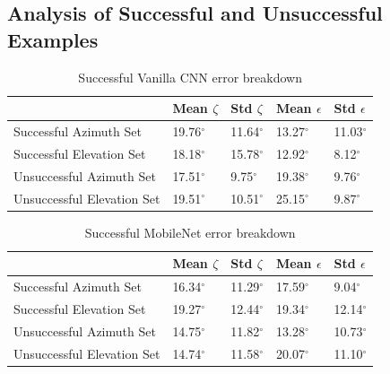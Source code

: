 \documentclass{article}
\begin{document}
{\subsection{Analysis of Successful and Unsuccessful Examples}
\begin{table}[h!]
  \begin{center}
    \caption{Successful Vanilla CNN error breakdown}
    \label{tab:tablebreakdown}
    \begin{tabular}{l|l|l|l|l}
      \textbf{} & \textbf{Mean $\zeta$} &  \textbf{Std $\zeta$} & \textbf{Mean $\epsilon$} &  \textbf{Std $\epsilon$}  \\
      \hline
      Successful Azimuth Set & 19.76$^{\circ}$ & 11.64$^{\circ}$& 13.27$^{\circ}$ & 11.03$^{\circ}$ \\
      Successful Elevation Set & 18.18$^{\circ}$  & 15.78$^{\circ}$ & 12.92$^{\circ}$ & 8.12$^{\circ}$\\
      Unsuccessful Azimuth Set & 17.51$^{\circ}$ & 9.75$^{\circ}$ & 19.38$^{\circ}$ & 9.76$^{\circ}$\\
      Unsuccessful Elevation Set & 19.51$^{\circ}$  & 10.51$^{\circ}$& 25.15$^{\circ}$ & 9.87$^{\circ}$\\
    \end{tabular}
  \end{center}
\end{table}

\begin{table}[h!]
  \begin{center}
    \caption{Successful MobileNet error breakdown}
    \label{tab:tablebreakdown}
    \begin{tabular}{l|l|l|l|l}
      \textbf{} & \textbf{Mean $\zeta$} &  \textbf{Std $\zeta$} & \textbf{Mean $\epsilon$} &  \textbf{Std $\epsilon$}  \\
      \hline
      Successful Azimuth Set & 16.34$^{\circ}$ & 11.29$^{\circ}$& 17.59$^{\circ}$ & 9.04$^{\circ}$ \\
      Successful Elevation Set & 19.27$^{\circ}$  & 12.44$^{\circ}$ & 19.34$^{\circ}$ & 12.14$^{\circ}$\\
      Unsuccessful Azimuth Set & 14.75$^{\circ}$ & 11.82$^{\circ}$ & 13.28$^{\circ}$ & 10.73$^{\circ}$\\
      Unsuccessful Elevation Set & 14.74$^{\circ}$  & 11.58$^{\circ}$& 20.07$^{\circ}$ & 11.10$^{\circ}$\\
    \end{tabular}
  \end{center}
\end{table}

}
\end{document}
